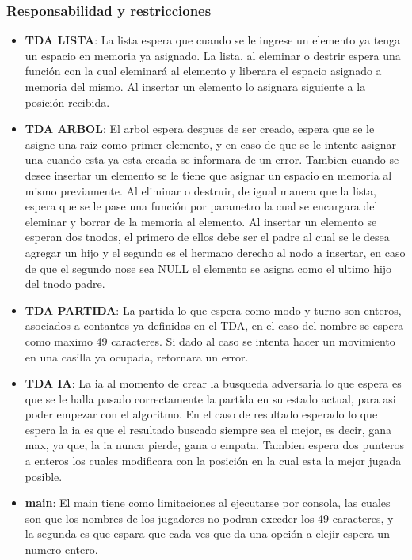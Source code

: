 \documentclass[12pt,twocolum,a4paper]{article}
\begin{document}
\subsubsection{Responsabilidad y restricciones}
\begin{itemize}
    \item {\bf TDA LISTA}: La lista espera que cuando se le ingrese un elemento ya tenga un espacio en memoria ya asignado. La lista, al eleminar o destrir espera una funci\'on con la cual eleminar\'a al elemento y liberara el espacio asignado a memoria del mismo. Al insertar un elemento lo asignara siguiente a la posici\'on recibida.
    \item {\bf TDA ARBOL}: El arbol espera despues de ser creado, espera que se le asigne una raiz como primer elemento, y en caso de que se le intente asignar una cuando esta ya esta creada se informara de un error. Tambien cuando se desee insertar un elemento se le tiene que asignar un espacio en memoria al mismo previamente. Al eliminar o destruir, de igual manera que la lista, espera que se le pase una funci\'on por parametro la cual se encargara del eleminar y borrar de la memoria al elemento. Al insertar un elemento se esperan dos tnodos, el primero de ellos debe ser el padre al cual se le desea agregar un hijo y el segundo es el hermano derecho al nodo a insertar, en caso de que el segundo nose sea NULL el elemento se asigna como el ultimo hijo del tnodo padre.
    \item {\bf TDA PARTIDA}: La partida lo que espera como modo y turno son enteros, asociados a contantes ya definidas en el TDA, en el caso del nombre se espera como maximo 49 caracteres. Si dado al caso se intenta hacer un movimiento en una casilla ya ocupada, retornara un error.
    \item {\bf TDA IA}: La ia al momento de crear la busqueda adversaria lo que espera es que se le halla pasado correctamente la partida en su estado actual, para asi poder empezar con el algoritmo. En el caso de resultado esperado lo que espera la ia es que el resultado buscado siempre sea el mejor, es decir, gana max, ya que, la ia nunca pierde, gana o empata. Tambien espera dos punteros a enteros los cuales modificara con la posici\'on en la cual esta la mejor jugada posible.
    \item {\bf main}: El main tiene como limitaciones al ejecutarse por consola, las cuales son que los nombres de los jugadores no podran exceder los 49 caracteres, y la segunda es que espara que cada ves que da una opci\'on a elejir espera un numero entero.
\end{itemize}
\end{document}
